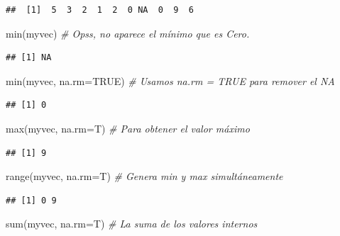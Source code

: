 \documentclass[
]{book}
\makeatletter
\newenvironment{Shaded}{\begin{snugshade}}{\end{snugshade}}
\newcommand{\AttributeTok}[1]{\textcolor[rgb]{0.77,0.63,0.00}{#1}}
\newcommand{\CommentTok}[1]{\textcolor[rgb]{0.56,0.35,0.01}{\textit{#1}}}
\newcommand{\ConstantTok}[1]{\textcolor[rgb]{0.00,0.00,0.00}{#1}}
\newcommand{\FunctionTok}[1]{\textcolor[rgb]{0.00,0.00,0.00}{#1}}
\newcommand{\NormalTok}[1]{#1}
\newenvironment{kframe}{%
\medskip{}
\setlength{\fboxsep}{.8em}
 \def\at@end@of@kframe{}%
 \ifinner\ifhmode%
  \def\at@end@of@kframe{\end{minipage}}%
  \begin{minipage}{\columnwidth}%
 \fi\fi%
 \def\FrameCommand##1{\hskip\@totalleftmargin \hskip-\fboxsep
 \colorbox{shadecolor}{##1}\hskip-\fboxsep
     \hskip-\linewidth \hskip-\@totalleftmargin \hskip\columnwidth}%
 \MakeFramed {\advance\hsize-\width
   \@totalleftmargin\z@ \linewidth\hsize
   \@setminipage}}%
 {\par\unskip\endMakeFramed%
 \at@end@of@kframe}
\renewenvironment{Shaded}{\begin{kframe}}{\end{kframe}}
\makeatother
\begin{document}
\begin{verbatim}
##  [1]  5  3  2  1  2  0 NA  0  9  6
\end{verbatim}

\begin{Shaded}
\begin{Highlighting}[]
\FunctionTok{min}\NormalTok{(myvec)  }\CommentTok{\# Opss, no aparece el mínimo que es Cero.}
\end{Highlighting}
\end{Shaded}

\begin{verbatim}
## [1] NA
\end{verbatim}

\begin{Shaded}
\begin{Highlighting}[]
\FunctionTok{min}\NormalTok{(myvec, }\AttributeTok{na.rm=}\ConstantTok{TRUE}\NormalTok{)  }\CommentTok{\# Usamos na.rm = TRUE para remover el NA}
\end{Highlighting}
\end{Shaded}

\begin{verbatim}
## [1] 0
\end{verbatim}

\begin{Shaded}
\begin{Highlighting}[]
\FunctionTok{max}\NormalTok{(myvec, }\AttributeTok{na.rm=}\NormalTok{T)  }\CommentTok{\# Para obtener el valor máximo}
\end{Highlighting}
\end{Shaded}

\begin{verbatim}
## [1] 9
\end{verbatim}

\begin{Shaded}
\begin{Highlighting}[]
\FunctionTok{range}\NormalTok{(myvec, }\AttributeTok{na.rm=}\NormalTok{T)  }\CommentTok{\# Genera min y max simultáneamente}
\end{Highlighting}
\end{Shaded}

\begin{verbatim}
## [1] 0 9
\end{verbatim}

\begin{Shaded}
\begin{Highlighting}[]
\FunctionTok{sum}\NormalTok{(myvec, }\AttributeTok{na.rm=}\NormalTok{T)  }\CommentTok{\# La suma de los valores internos}
\end{Highlighting}
\end{Shaded}
\end{document}

